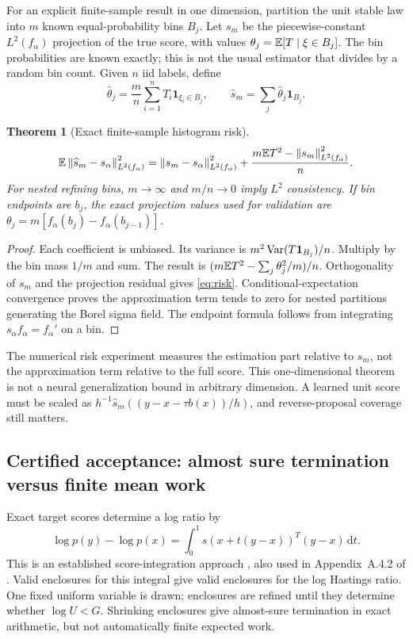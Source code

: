 \documentclass[11pt]{article}
\newtheorem{theorem}{Theorem}[section]
\theoremstyle{definition}\newtheorem{definition}[theorem]{Definition}
\theoremstyle{remark}\newtheorem{remark}[theorem]{Remark}
\numberwithin{equation}{section}
\newcommand{\norm}[1]{\left\lVert#1\right\rVert}\newcommand{\TV}{\mathrm{TV}}
\newcommand{\dd}{\,\mathrm d}\newcommand{\cA}{c_\alpha}\newcommand{\sg}{\operatorname{sigmoid}}
\newcommand{\1}{\mathbf 1}
\begin{document}
For an explicit finite-sample result in one dimension, partition the unit stable law into $m$ known equal-probability bins $B_j$. Let $s_m$ be the piecewise-constant $L^2(f_\alpha)$ projection of the true score, with values $\theta_j=\mathbb E[T\mid\xi\in B_j]$. The bin probabilities are known exactly; this is not the usual estimator that divides by a random bin count. Given $n$ iid labels, define
\[
\widehat\theta_j=\frac mn\sum_{i=1}^nT_i\1_{\xi_i\in B_j},
\qquad \widehat s_m=\sum_j\widehat\theta_j\1_{B_j}.
\]
\begin{theorem}[Exact finite-sample histogram risk]\label{thm:risk}
\begin{equation}
\E\norm{\widehat s_m-s_\alpha}_{L^2(f_\alpha)}^2
=\norm{s_m-s_\alpha}_{L^2(f_\alpha)}^2+
\frac{m\E T^2-\norm{s_m}_{L^2(f_\alpha)}^2}{n}.\label{eq:risk}
\end{equation}
For nested refining bins, $m\to\infty$ and $m/n\to0$ imply $L^2$ consistency. If bin endpoints are $b_j$, the exact projection values used for validation are $\theta_j=m[f_\alpha(b_j)-f_\alpha(b_{j-1})]$.
\end{theorem}
\begin{proof}
Each coefficient is unbiased. Its variance is
$m^2\Var(T\1_{B_j})/n$. Multiply by the bin mass $1/m$ and sum. The result is $(m\mathbb E T^2-\sum_j\theta_j^2/m)/n$. Orthogonality of $s_m$ and the projection residual gives \eqref{eq:risk}. Conditional-expectation convergence proves the approximation term tends to zero for nested partitions generating the Borel sigma field. The endpoint formula follows from integrating $s_\alpha f_\alpha=f_\alpha'$ on a bin.
\end{proof}
The numerical risk experiment measures the estimation part relative to $s_m$, not the approximation term relative to the full score. This one-dimensional theorem is not a neural generalization bound in arbitrary dimension. A learned unit score must be scaled as $h^{-1}\widehat s_m((y-x-\tau b(x))/h)$, and reverse-proposal coverage still matters.

\subsection{Certified acceptance: almost sure termination versus finite mean work}
Exact target scores determine a log ratio by
\begin{equation}
\log p(y)-\log p(x)=\int_0^1s(x+t(y-x))^T(y-x)\dd t.\label{eq:scoreintegral}
\end{equation}
This is an established score-integration approach \citep{sjoberg}, also used in Appendix~A.4.2 of \citet{fractional}. Valid enclosures for this integral give valid enclosures for the log Hastings ratio. One fixed uniform variable is drawn; enclosures are refined until they determine whether $\log U<G$. Shrinking enclosures give almost-sure termination in exact arithmetic, but not automatically finite expected work.
\end{document}
